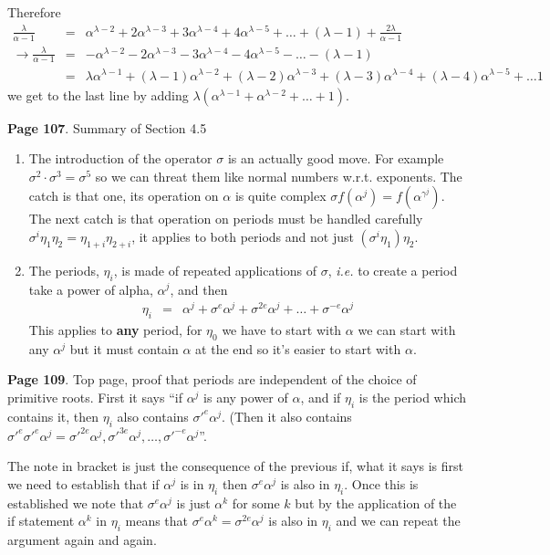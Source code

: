 \documentclass[aps,preprint,preprintnumbers,nofootinbib,showpacs,prd]{revtex4-1}
\newcommand{\ie}{{\it i.e.} }
\newcommand{\nbea}{\begin{eqnarray*}}
\newcommand{\neea}{\end{eqnarray*}}
\begin{document}
Therefore
%
\nbea
\frac{\lambda}{\alpha - 1} & = & \alpha^{\lambda - 2} + 2\alpha^{\lambda - 3} + 3\alpha^{\lambda - 4} + 4\alpha^{\lambda - 5} + \dots + (\lambda - 1) + \frac{2\lambda}{\alpha - 1} \\
\to \frac{\lambda}{\alpha - 1} & = & -\alpha^{\lambda - 2} - 2\alpha^{\lambda - 3} - 3\alpha^{\lambda - 4} - 4\alpha^{\lambda - 5} - \dots - (\lambda - 1) \\
& = & \lambda \alpha^{\lambda -1} + (\lambda - 1)\alpha^{\lambda - 2} + (\lambda - 2)\alpha^{\lambda - 3} + (\lambda - 3)\alpha^{\lambda - 4} + (\lambda - 4)\alpha^{\lambda - 5} + \dots 1
\neea
%
we get to the last line by adding $\lambda(\alpha^{\lambda - 1} + \alpha^{\lambda - 2} + \dots + 1)$.

{\bf Page 107}. Summary of Section 4.5
%
\begin{enumerate}
%
\item The introduction of the operator $\sigma$ is an actually good move. For example $\sigma^2 \cdot \sigma^3 = \sigma^5$ so we can threat them like normal numbers w.r.t. exponents. The catch is that one, its operation on $\alpha$ is quite complex $\sigma f(\alpha^j) = f(\alpha^{\gamma^j})$. The next catch is that operation on periods must be handled carefully $\sigma^i \eta_1\eta_2 = \eta_{1+i}\eta_{2+i}$, it applies to both periods and not just $(\sigma^i\eta_1) \eta_2$.
%
\item The periods, $\eta_i$, is made of repeated applications of $\sigma$, \ie to create a period take a power of alpha, $\alpha^j$, and then
%
\nbea
\eta_i & = & \alpha^j + \sigma^e \alpha^j + \sigma^{2e}\alpha^j + \dots + \sigma^{-e}\alpha^j
\neea
%
This applies to {\bf any} period, for $\eta_0$ we have to start with $\alpha$ we can start with any $\alpha^j$ but it must contain $\alpha$ at the end so it's easier to start with $\alpha$.
%
\end{enumerate}
%

{\bf Page 109}. Top page, proof that periods are independent of the choice of primitive roots. First it says ``if $\alpha^j$ is any power of $\alpha$, and if $\eta_i$ is the period which contains it, then $\eta_i$ also contains $\sigma'^{e} \alpha^j$. (Then it also contains $\sigma'^{e}\sigma'^{e}\alpha^j = \sigma'^{2e}\alpha^j,\sigma'^{3e}\alpha^j, \dots, \sigma'^{-e}\alpha^j$''.

The note in bracket is just the consequence of the previous if, what it says is first we need to establish that if $\alpha^j$ is in $\eta_i$ then $\sigma^e \alpha^j$ is also in $\eta_i$. Once this is established we note that $\sigma^e \alpha^j$ is just 
$\alpha^k$ for some $k$ but by the application of the if statement $\alpha^k$ in $\eta_i$ means that $\sigma^e \alpha^k = \sigma^{2e} \alpha^j$ is also in $\eta_i$ and we can repeat the argument again and again.
\end{document}
